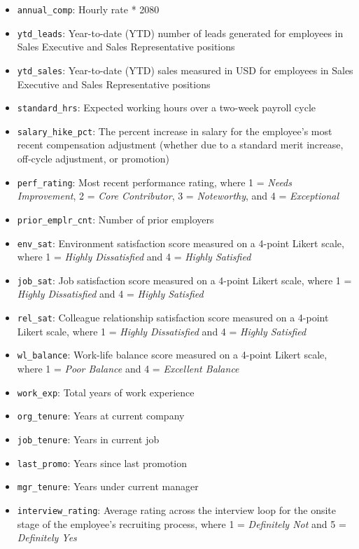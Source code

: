 \documentclass[
]{book}
\begin{document}
\begin{itemize}
\item
  \texttt{annual\_comp}: Hourly rate * 2080
\item
  \texttt{ytd\_leads}: Year-to-date (YTD) number of leads generated for employees in Sales Executive and Sales Representative positions
\item
  \texttt{ytd\_sales}: Year-to-date (YTD) sales measured in USD for employees in Sales Executive and Sales Representative positions
\item
  \texttt{standard\_hrs}: Expected working hours over a two-week payroll cycle
\item
  \texttt{salary\_hike\_pct}: The percent increase in salary for the employee's most recent compensation adjustment (whether due to a standard merit increase, off-cycle adjustment, or promotion)
\item
  \texttt{perf\_rating}: Most recent performance rating, where 1 = \emph{Needs Improvement}, 2 = \emph{Core Contributor}, 3 = \emph{Noteworthy}, and 4 = \emph{Exceptional}
\item
  \texttt{prior\_emplr\_cnt}: Number of prior employers
\item
  \texttt{env\_sat}: Environment satisfaction score measured on a 4-point Likert scale, where 1 = \emph{Highly Dissatisfied} and 4 = \emph{Highly Satisfied}
\item
  \texttt{job\_sat}: Job satisfaction score measured on a 4-point Likert scale, where 1 = \emph{Highly Dissatisfied} and 4 = \emph{Highly Satisfied}
\item
  \texttt{rel\_sat}: Colleague relationship satisfaction score measured on a 4-point Likert scale, where 1 = \emph{Highly Dissatisfied} and 4 = \emph{Highly Satisfied}
\item
  \texttt{wl\_balance}: Work-life balance score measured on a 4-point Likert scale, where 1 = \emph{Poor Balance} and 4 = \emph{Excellent Balance}
\item
  \texttt{work\_exp}: Total years of work experience
\item
  \texttt{org\_tenure}: Years at current company
\item
  \texttt{job\_tenure}: Years in current job
\item
  \texttt{last\_promo}: Years since last promotion
\item
  \texttt{mgr\_tenure}: Years under current manager
\item
  \texttt{interview\_rating}: Average rating across the interview loop for the onsite stage of the employee's recruiting process, where 1 = \emph{Definitely Not} and 5 = \emph{Definitely Yes}
\end{itemize}
\end{document}
